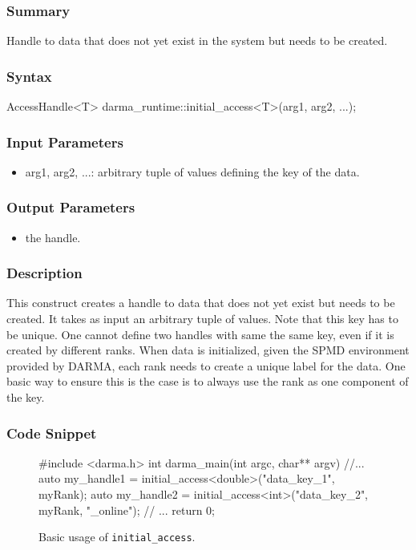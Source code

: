 \begin{subs}
\vspace{-1.2cm}

\subsubsection{Summary} 
Handle to data that does not yet exist in the system 
but needs to be created.

\subsubsection{Syntax} 
\begin{CppCode}
AccessHandle<T> darma_runtime::initial_access<T>(arg1, arg2, ...);
\end{CppCode}

\subsubsection{Input Parameters} 
\begin{itemize}
\item arg1, arg2, ...: arbitrary tuple of values defining the key of the data.
\end{itemize}

\subsubsection{Output Parameters} 
\begin{itemize}
\item the handle.  
\end{itemize}

\subsubsection{Description} 
This construct creates a handle to data that does not yet 
exist but needs to be created. It takes as input an arbitrary 
tuple of values. Note that this key has to be unique. 
One cannot define two handles with same the same key, even if 
it is created by different ranks. 
When data is initialized, given the SPMD environment provided by DARMA, 
each rank needs to create a unique label for the data. 
One basic way to ensure this is the case is to always use the rank 
as one component of the key. 

\subsubsection{Code Snippet} 
\begin{figure}[!h]
\begin{CppCodeNumb}
#include <darma.h>
int darma_main(int argc, char** argv)
{
	//...
  auto my_handle1 = initial_access<double>("data_key_1", myRank);
  auto my_handle2 = initial_access<int>("data_key_2", myRank, "_online");
  // ...
  return 0;
}
\end{CppCodeNumb}
\label{fig:fe_api_initialaccess}
\caption{Basic usage of \texttt{initial\_access}.}
\end{figure}

\end{subs}
